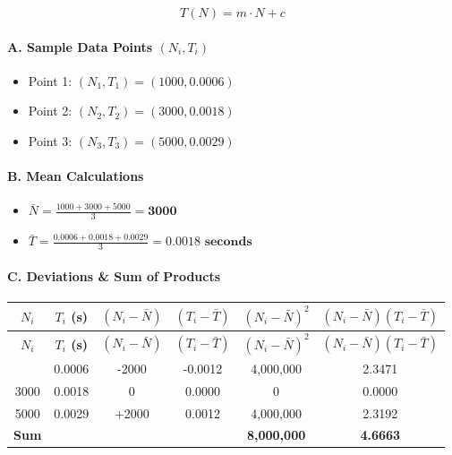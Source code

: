 \documentclass[11pt,a4paper]{article}
\begin{document}
\[ T(N) = m \cdot N + c \]


\paragraph{A. Sample Data Points $(N_i, T_i)$}
\begin{itemize}
\item Point 1: $(N_1, T_1) = (1000, 0.0006)$
\item Point 2: $(N_2, T_2) = (3000, 0.0018)$
\item Point 3: $(N_3, T_3) = (5000, 0.0029)$
\end{itemize}

\paragraph{B. Mean Calculations}
\begin{itemize}
\item $\bar{N} = \frac{1000 + 3000 + 5000}{3} = \mathbf{3000}$
\item $\bar{T} = \frac{0.0006 + 0.0018 + 0.0029}{3} = \mathbf{0.0018\text{ seconds}}$
\end{itemize}

\paragraph{C. Deviations \& Sum of Products}
{\begingroup
\footnotesize
\setlength{\tabcolsep}{3.5pt}
\begin{xltabular}{\textwidth}{C | C | C | C | C | C}
\toprule
\textbf{$N_i$} & \textbf{$T_i$ (s)} & \textbf{$(N_i - \bar{N})$} & \textbf{$(T_i - \bar{T})$} & \textbf{$(N_i - \bar{N})^2$} & \textbf{$(N_i - \bar{N})(T_i - \bar{T})$} \\
\midrule
\endfirsthead
\toprule
\textbf{$N_i$} & \textbf{$T_i$ (s)} & \textbf{$(N_i - \bar{N})$} & \textbf{$(T_i - \bar{T})$} & \textbf{$(N_i - \bar{N})^2$} & \textbf{$(N_i - \bar{N})(T_i - \bar{T})$} \\
\midrule
\endfirsthead
\endhead
\bottomrule
\endfoot
\bottomrule
{} & 0.0006 & -2000 & -0.0012 & 4,000,000 & 2.3471 \\
3000 & 0.0018 & 0 & 0.0000 & 0 & 0.0000 \\
5000 & 0.0029 & +2000 & 0.0012 & 4,000,000 & 2.3192 \\
\textbf{Sum} &  &  &  & \textbf{8,000,000} & \textbf{4.6663} \\
\end{xltabular}
\endgroup}
\end{document}
